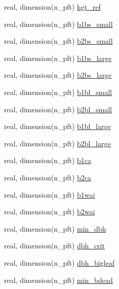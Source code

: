 \begin{DoxyCompactItemize}
real, dimension(n\+\_\+pft) \hyperlink{namespacepft__coms_a8cc0c7c9a26d749fd17c1ddc8633ea8a}{hgt\+\_\+ref}
\item 
real, dimension(n\+\_\+pft) \hyperlink{namespacepft__coms_a9a7ea1fec116893e64d9d8ace1c14e0c}{b1bs\+\_\+small}
\item 
real, dimension(n\+\_\+pft) \hyperlink{namespacepft__coms_a184732d6139803d34ee55b42fb921695}{b2bs\+\_\+small}
\item 
real, dimension(n\+\_\+pft) \hyperlink{namespacepft__coms_a5a61d97876e834a3e2618c85a2310bba}{b1bs\+\_\+large}
\item 
real, dimension(n\+\_\+pft) \hyperlink{namespacepft__coms_aed3d2b057ee3fbf66a115868344eaa33}{b2bs\+\_\+large}
\item 
real, dimension(n\+\_\+pft) \hyperlink{namespacepft__coms_acec323ee151ee47b0173bc85ef816453}{b1bl\+\_\+small}
\item 
real, dimension(n\+\_\+pft) \hyperlink{namespacepft__coms_ab0d33f3125e1ddd008763f955beceb8d}{b2bl\+\_\+small}
\item 
real, dimension(n\+\_\+pft) \hyperlink{namespacepft__coms_a214f419aed39937155b3b0e22ef55437}{b1bl\+\_\+large}
\item 
real, dimension(n\+\_\+pft) \hyperlink{namespacepft__coms_a3047801affde1c1d10ddb8ceed1e6cb7}{b2bl\+\_\+large}
\item 
real, dimension(n\+\_\+pft) \hyperlink{namespacepft__coms_a56ccfd1fc49345702eb25a9a9f4a5756}{b1ca}
\item 
real, dimension(n\+\_\+pft) \hyperlink{namespacepft__coms_a2380072ccb1b4557283c4f7d44398c9c}{b2ca}
\item 
real, dimension(n\+\_\+pft) \hyperlink{namespacepft__coms_ad8ddc641c836a1062e3157400b675217}{b1wai}
\item 
real, dimension(n\+\_\+pft) \hyperlink{namespacepft__coms_a31ab705538ba69a865a41647d0bd5d63}{b2wai}
\item 
real, dimension(n\+\_\+pft) \hyperlink{namespacepft__coms_a6290d41cd79d6f8ac7819f9bf06cad60}{min\+\_\+dbh}
\item 
real, dimension(n\+\_\+pft) \hyperlink{namespacepft__coms_a39e1c4892ebafc9be2ac78b48d954d5c}{dbh\+\_\+crit}
\item 
real, dimension(n\+\_\+pft) \hyperlink{namespacepft__coms_a86747c6ee955a89a55612d189bf255f8}{dbh\+\_\+bigleaf}
\item 
real, dimension(n\+\_\+pft) \hyperlink{namespacepft__coms_af689fc3f0c233590c72175bf99d1c8f6}{min\+\_\+bdead}
\item 

\end{DoxyCompactItemize}
